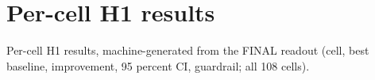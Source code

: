 \onecolumn

\section{Per-cell H1 results}

Per-cell H1 results, machine-generated from the FINAL readout (cell, best baseline, improvement, 95 percent CI, guardrail; all 108 cells).

{\footnotesize

}
